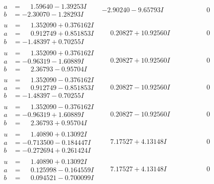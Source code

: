 \documentclass[1p]{elsarticle_modified}
\theoremstyle{definition}
\begin{document}
$$\begin{array}{c|c|c}
\begin{aligned}
a &= \phantom{-}1.59640 - 1.39253 I \\
b &= -2.30070 - 1.28293 I\end{aligned}
 & -2.90240 - 9.65793 I & \phantom{-0.000000 } 0 \\ \hline\begin{aligned}
u &= \phantom{-}1.352090 + 0.376162 I \\
a &= \phantom{-}0.912749 + 0.851853 I \\
b &= -1.48397 + 0.70255 I\end{aligned}
 & \phantom{-}0.20827 + 10.92560 I & \phantom{-0.000000 } 0 \\ \hline\begin{aligned}
u &= \phantom{-}1.352090 + 0.376162 I \\
a &= -0.96319 - 1.60889 I \\
b &= \phantom{-}2.36793 - 0.95704 I\end{aligned}
 & \phantom{-}0.20827 + 10.92560 I & \phantom{-0.000000 } 0 \\ \hline\begin{aligned}
u &= \phantom{-}1.352090 - 0.376162 I \\
a &= \phantom{-}0.912749 - 0.851853 I \\
b &= -1.48397 - 0.70255 I\end{aligned}
 & \phantom{-}0.20827 - 10.92560 I & \phantom{-0.000000 } 0 \\ \hline\begin{aligned}
u &= \phantom{-}1.352090 - 0.376162 I \\
a &= -0.96319 + 1.60889 I \\
b &= \phantom{-}2.36793 + 0.95704 I\end{aligned}
 & \phantom{-}0.20827 - 10.92560 I & \phantom{-0.000000 } 0 \\ \hline\begin{aligned}
u &= \phantom{-}1.40890 + 0.13092 I \\
a &= -0.713500 - 0.184447 I \\
b &= -0.272694 + 0.261424 I\end{aligned}
 & \phantom{-}7.17527 + 4.13148 I & \phantom{-0.000000 } 0 \\ \hline\begin{aligned}
u &= \phantom{-}1.40890 + 0.13092 I \\
a &= \phantom{-}0.125998 - 0.164559 I \\
b &= \phantom{-}0.094521 - 0.700099 I\end{aligned}
 & \phantom{-}7.17527 + 4.13148 I & \phantom{-0.000000 } 0 \\ \hline\begin{aligned}

\end{aligned}
\end{array}$$
\end{document}

